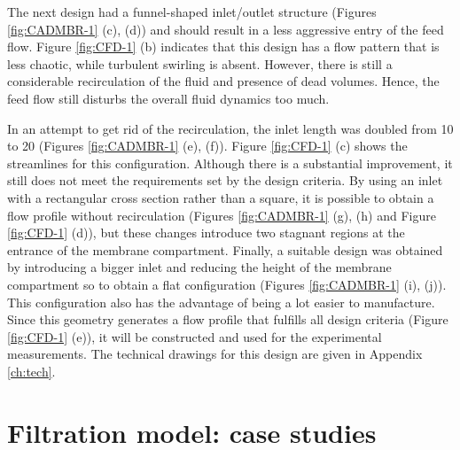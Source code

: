 The next design had a funnel-shaped inlet/outlet structure (Figures \ref{fig:CADMBR-1} (c), (d)) and should result in a less aggressive entry of the feed flow. Figure \ref{fig:CFD-1} (b) indicates that this design has a flow pattern that is less chaotic, while turbulent swirling is absent. However, there is still a considerable recirculation of the fluid and presence of dead volumes. Hence, the feed flow still disturbs the overall fluid dynamics too much. \par
In an attempt to get rid of the recirculation, the inlet length was doubled from 10 to \unit{20}{\centi\metre} (Figures \ref{fig:CADMBR-1} (e), (f)). Figure \ref{fig:CFD-1} (c) shows the streamlines for this configuration. Although there is a substantial improvement, it still does not meet the requirements set by the design criteria. By using an inlet with a rectangular cross section rather than a square, it is possible to obtain a flow profile without recirculation (Figures \ref{fig:CADMBR-1} (g), (h) and Figure \ref{fig:CFD-1} (d)), but these changes introduce two stagnant regions at the entrance of the membrane compartment. 
Finally, a suitable design was obtained by introducing a bigger inlet and reducing the height of the membrane compartment so to obtain a flat configuration (Figures \ref{fig:CADMBR-1} (i), (j)). This configuration also has the advantage of being a lot easier to manufacture. Since this geometry generates a flow profile that fulfills all design criteria (Figure \ref{fig:CFD-1} (e)), it will be constructed and used for the experimental measurements. The technical drawings for this design are given in Appendix \ref{ch:tech}.


\section[Case studies]{Filtration model: case studies \label{sec:casestud}}

